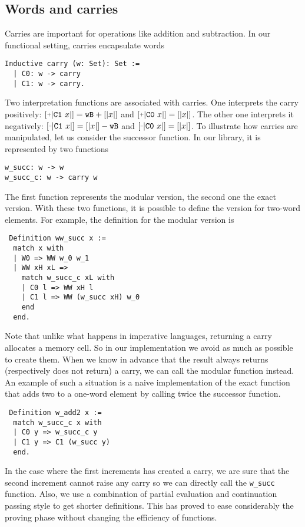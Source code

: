 \subsection{Words and carries}

Carries are important for operations like addition and subtraction.
In our functional setting, carries encapsulate words
\begin{verbatim}
Inductive carry (w: Set): Set :=
  | C0: w -> carry
  | C1: w -> carry.
\end{verbatim}
Two interpretation functions are associated with carries.
One interprets the carry positively: $\ICP{\CI x} = \wB + [|x|]$ and
$\ICP{\CO x} = [|x|]$. 
The other one interprets it negatively:
$\ICM{\CI x} = [|x|] - \wB$ and $\ICM{\CO x} = [|x|]$.
To illustrate how carries are manipulated, let us consider the successor function.
In our library, it is represented by two functions
\begin{verbatim}
w_succ: w -> w
w_succ_c: w -> carry w
\end{verbatim}
The first function represents the modular version, the second one the exact 
version. With these two functions, it is possible to define the version
for two-word elements. For example, the definition for the modular version is
\begin{verbatim}
 Definition ww_succ x :=
  match x with
  | W0 => WW w_0 w_1
  | WW xH xL =>
    match w_succ_c xL with
    | C0 l => WW xH l
    | C1 l => WW (w_succ xH) w_0
    end
  end.
\end{verbatim}
Note that unlike what happens in imperative languages, returning
a carry allocates a memory cell. So in our implementation
we avoid as much as possible to create them. When we know in advance 
that the result always returns (respectively does not return) a carry, we can call the modular function instead. 
An example of such a situation is a naive implementation of the exact function that adds two to a 
one-word element by calling twice the successor function.
\begin{verbatim}
 Definition w_add2 x :=
  match w_succ_c x with
  | C0 y => w_succ_c y
  | C1 y => C1 (w_succ y)
  end.
\end{verbatim}
In the case where the first increments has created a carry, we are sure that the second
increment cannot raise any carry so we can directly call the {\tt w\_succ} function.
Also, we use a combination of partial evaluation and continuation passing style to get
shorter definitions. This has proved to ease considerably the proving phase without
changing the efficiency of functions.

